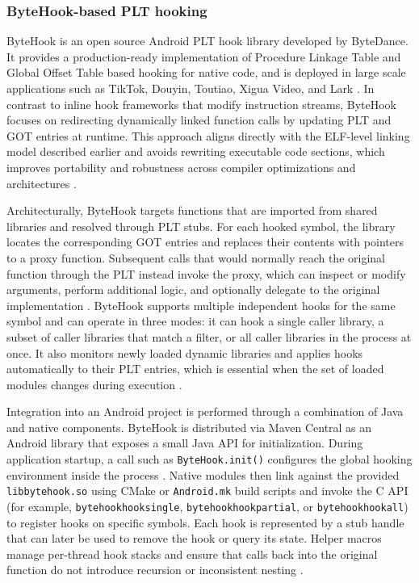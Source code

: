 \documentclass[11pt,a4paper]{report}
\renewcommand\_{{\textunderscore\allowbreak}}
\begin{document}
\subsubsection{ByteHook-based PLT hooking}

ByteHook is an open source Android PLT hook library developed by ByteDance. It provides a production-ready implementation of Procedure Linkage Table and Global Offset Table based hooking for native code, and is deployed in large scale applications such as TikTok, Douyin, Toutiao, Xigua Video, and Lark \cite{bytehook2025github}. In contrast to inline hook frameworks that modify instruction streams, ByteHook focuses on redirecting dynamically linked function calls by updating PLT and GOT entries at runtime. This approach aligns directly with the ELF-level linking model described earlier and avoids rewriting executable code sections, which improves portability and robustness across compiler optimizations and architectures \cite{pizzi2022virtualpatch}.

Architecturally, ByteHook targets functions that are imported from shared libraries and resolved through PLT stubs. For each hooked symbol, the library locates the corresponding GOT entries and replaces their contents with pointers to a proxy function. Subsequent calls that would normally reach the original function through the PLT instead invoke the proxy, which can inspect or modify arguments, perform additional logic, and optionally delegate to the original implementation \cite{bytehook2025github,pizzi2022virtualpatch}. ByteHook supports multiple independent hooks for the same symbol and can operate in three modes: it can hook a single caller library, a subset of caller libraries that match a filter, or all caller libraries in the process at once. It also monitors newly loaded dynamic libraries and applies hooks automatically to their PLT entries, which is essential when the set of loaded modules changes during execution \cite{bytehook2025github}.

Integration into an Android project is performed through a combination of Java and native components. ByteHook is distributed via Maven Central as an Android library that exposes a small Java API for initialization. During application startup, a call such as \texttt{ByteHook.init()} configures the global hooking environment inside the process \cite{bytehook2025github,bytehook2025maven}. Native modules then link against the provided \texttt{libbytehook.so} using CMake or \texttt{Android.mk} build scripts and invoke the C API (for example, \texttt{bytehook\_hook\_single}, \texttt{bytehook\_hook\_partial}, or \texttt{bytehook\_hook\_all}) to register hooks on specific symbols. Each hook is represented by a stub handle that can later be used to remove the hook or query its state. Helper macros manage per-thread hook stacks and ensure that calls back into the original function do not introduce recursion or inconsistent nesting \cite{bytehook2025github}.
\end{document}
